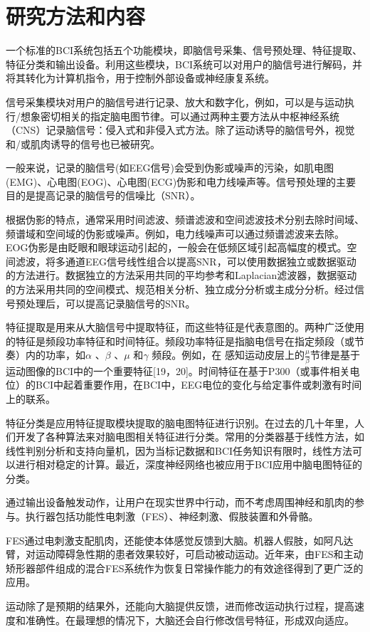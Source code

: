\documentclass[UTF8,a4paper]{ctexart}
\begin{document}
\section{研究方法和内容}
一个标准的BCI系统包括五个功能模块，即脑信号采集、信号预处理、特征提取、特征分类和输出设备。利用这些模块，BCI系统可以对用户的脑信号进行解码，并将其转化为计算机指令，用于控制外部设备或神经康复系统。
\par
信号采集模块对用户的脑信号进行记录、放大和数字化，例如，可以是与运动执行/想象密切相关的指定脑电图节律。可以通过两种主要方法从中枢神经系统（CNS）记录脑信号：侵入式和非侵入式方法。除了运动诱导的脑信号外，视觉和/或肌肉诱导的信号也已被研究\cite{SHIH2012268}。
\par
一般来说，记录的脑信号(如EEG信号)会受到伪影或噪声的污染，如肌电图(EMG)、心电图(EOG)、心电图(ECG)伪影和电力线噪声等。信号预处理的主要目的是提高记录的脑信号的信噪比（SNR）。
\par
根据伪影的特点，通常采用时间滤波、频谱滤波和空间滤波技术分别去除时间域、频谱域和空间域的伪影或噪声。例如，电力线噪声可以通过频谱滤波来去除。EOG伪影是由眨眼和眼球运动引起的，一般会在低频区域引起高幅度的模式。空间滤波，将多通道EEG信号线性组合以提高SNR，可以使用数据独立或数据驱动的方法进行。数据独立的方法采用共同的平均参考和Laplacian滤波器，数据驱动的方法采用共同的空间模式、规范相关分析、独立成分分析或主成分分析\cite{lotte2018review,bashashati2007survey}。经过信号预处理后，可以提高记录脑信号的SNR。
\par
特征提取是用来从大脑信号中提取特征，而这些特征是代表意图的。两种广泛使用的特征是频段功率特征和时间特征。频段功率特征是指脑电信号在指定频段（或节奏）内的功率，如$\alpha$ 、$\beta$ 、$\mu$ 和$\gamma$ 频段。例如，在
感知运动皮层上的$\frac{\mu}{\beta}$节律是基于运动图像的BCI中的一个重要特征[19，20]。时间特征在基于P300（或事件相关电位）的BCI中起着重要作用，在BCI中，EEG电位的变化与给定事件或刺激有时间上的联系\cite{hochberg2012reach}。
\par
特征分类是应用特征提取模块提取的脑电图特征进行识别。在过去的几十年里，人们开发了各种算法来对脑电图相关特征进行分类\cite{lotte2018review,bashashati2007survey}。常用的分类器基于线性方法，如线性判别分析和支持向量机，因为当标记数据和BCI任务知识有限时，线性方法可以进行相对稳定的计算\cite{muller2003linear}。最近，深度神经网络也被应用于BCI应用中脑电图特征的分类\cite{lotte2018review}。
\par
通过输出设备触发动作，让用户在现实世界中行动，而不考虑周围神经和肌肉的参与。执行器包括功能性电刺激（FES）、神经刺激、假肢装置和外骨骼。
\par
FES通过电刺激支配肌肉，还能使本体感觉反馈到大脑。机器人假肢，如阿凡达臂，对运动障碍急性期的患者效果较好，可启动被动运动。近年来，由FES和主动矫形器部件组成的混合FES系统作为恢复日常操作能力的有效途径得到了更广泛的应用\cite{rupp2012development}。
\par
运动除了是预期的结果外，还能向大脑提供反馈，进而修改运动执行过程，提高速度和准确性\cite{wolpaw2002brain,mcfarland2017therapeutic}。在最理想的情况下，大脑还会自行修改信号特征，形成双向适应\cite{wolpaw2002brain}。
\end{document}

